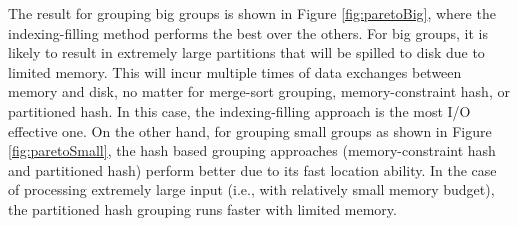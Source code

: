 The result for grouping big groups is shown in Figure \ref{fig:paretoBig}, where the indexing-filling method performs the best over the others. For big groups, it is likely to result in extremely large partitions that will be spilled to disk due to limited memory. This will incur multiple times of data exchanges between memory and disk, no matter for merge-sort grouping, memory-constraint hash, or partitioned hash. In this case, the indexing-filling approach is the most I/O effective one. On the other hand, for grouping small groups as shown in Figure \ref{fig:paretoSmall}, the hash based grouping approaches (memory-constraint hash and partitioned hash) perform better due to its fast location ability. In the case of processing extremely large input (i.e., with relatively small memory budget), the partitioned hash grouping runs faster with limited memory.








